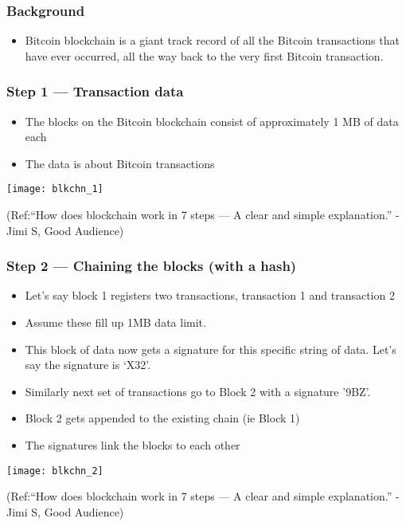 \begin{frame}[fragile]\frametitle{Background}
\begin{itemize}
\item Bitcoin blockchain is a giant track record of all the Bitcoin transactions that have ever occurred, all the way back to the very first Bitcoin transaction.
\end{itemize}


\end{frame}

\begin{frame}[fragile]\frametitle{Step 1 — Transaction data}
\begin{itemize}
\item The blocks on the Bitcoin blockchain consist of approximately 1 MB of data each
\item The data is about Bitcoin transactions
\end{itemize}

\begin{center}
\texttt{[image: blkchn\_1]}

{\tiny (Ref:``How does blockchain work in 7 steps — A clear and simple explanation.'' - Jimi S, Good Audience)}
\end{center}

\end{frame}

\begin{frame}[fragile]\frametitle{Step 2 — Chaining the blocks (with a hash)}
\begin{itemize}
\item Let’s say block 1 registers two transactions, transaction 1 and transaction 2
\item Assume these fill up 1MB data limit.
\item This block of data now gets a signature for this specific string of data. Let’s say the signature is ‘X32’.
\item Similarly next set of transactions go to Block 2 with a signature '9BZ'.
\item Block 2 gets appended to the existing chain (ie Block 1) 
\item The signatures link the blocks to each other
\end{itemize}

\begin{center}
\texttt{[image: blkchn\_2]}

{\tiny (Ref:``How does blockchain work in 7 steps — A clear and simple explanation.'' - Jimi S, Good Audience)}
\end{center}

\end{frame}

